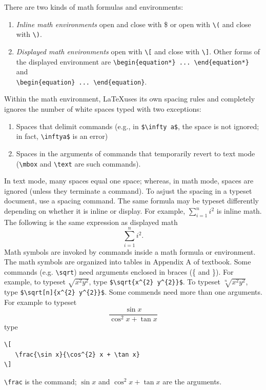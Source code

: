 \documentclass[12pt]{article}
\begin{document}
There are two kinds of math formulas and environments:
\begin{enumerate}
    \item \emph{Inline math environments} open and close with \$ or open with \verb+\(+ and close with \verb+\)+.
    \item \emph{Displayed math environments} open with \verb+\[+ and close with \verb+\]+.  Other forms of the displayed
    environment are \verb+\begin{equation*} ... \end{equation*}+ and\\
    \verb+\begin{equation} ... \end{equation}+.
\end{enumerate}
Within the math environment, \LaTeX uses its own spacing rules and completely ignores the number of white spaces typed with two exceptions:
\begin{enumerate}
    \item Spaces that delimit commands (e.g., in \verb+$\infty a$+, the space is not ignored; in fact, \verb+\inftya$+ is
        an error)
    \item Spaces in the arguments of commands that temporarily revert to text mode (\verb+\mbox+ and \verb+\text+ are such commands).
\end{enumerate}
In text mode, many spaces equal one space; whereas, in math mode, spaces are ignored (unless they terminate a command). To asjust the spacing in a typeset document, use a spacing command. The same formula may be typeset differently depending on whether it is inline or display. For example, $\sum_{i=1}^{n} i^{2}$ is inline math.  The following is the same expression as displayed math
\[
    \sum_{i=1}^{n} i^{2}.
\]
Math symbols are invoked by commands inside a math formula or environment. The math symbols are organized into tables in Appendix A of textbook. Some commands (e.g. \verb+\sqrt+) need arguments enclosed in braces (\{ and \}).  For example, to typeset $\sqrt{x^{2} y^{2}}$, type \verb+$\sqrt{x^{2} y^{2}}$+. To typeset $\sqrt[n]{x^{2} y^{2}}$, type \verb+$\sqrt[n]{x^{2} y^{2}}$+. Some commends need more than one arguments.  For example to typeset
\[
    \frac{\sin x}{\cos^{2} x + \tan x}
\]
type
\begin{verbatim}
\[
   \frac{\sin x}{\cos^{2} x + \tan x}
\]
\end{verbatim}
\verb+\frac+ is the command; $\sin x$ and $\cos^{2} x + \tan x$ are the arguments.\\
\end{document}
